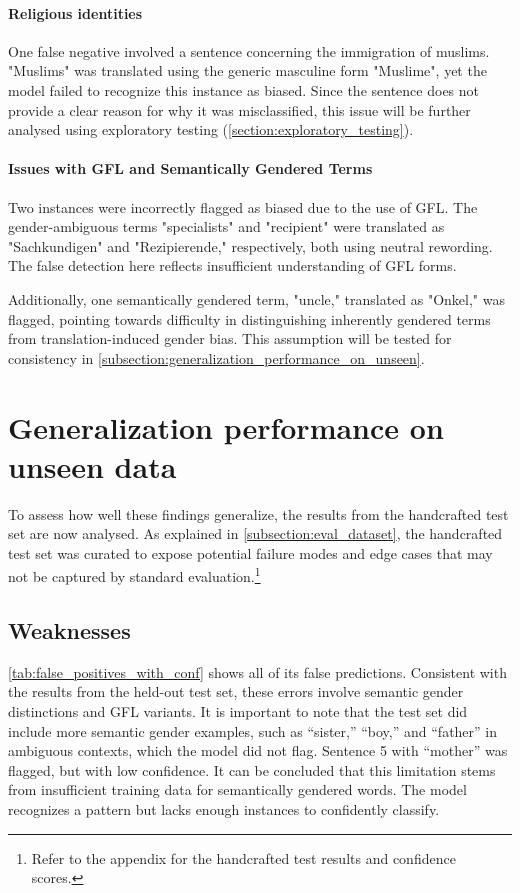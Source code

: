     \paragraph{Religious identities}
    
    One false negative involved a sentence concerning the immigration of muslims. "Muslims" was translated using the generic masculine form "Muslime", yet the model failed to recognize this instance as biased. Since the sentence does not provide a clear reason for why it was misclassified, this issue will be further analysed using exploratory testing (\autoref{section:exploratory_testing}).

    \paragraph{Issues with GFL and Semantically Gendered Terms}

    Two instances were incorrectly flagged as biased due to the use of GFL. The gender-ambiguous terms "specialists" and "recipient" were translated as "Sachkundigen" and "Rezipierende," respectively, both using neutral rewording. The false detection here reflects insufficient understanding of GFL forms.

    Additionally, one semantically gendered term, "uncle," translated as "Onkel," was flagged, pointing towards difficulty in distinguishing inherently gendered terms from translation-induced gender bias. This assumption will be tested for consistency in \autoref{subsection:generalization_performance_on_unseen}.

\section{Generalization performance on unseen data} \label{subsection:generalization_performance_on_unseen}
    To assess how well these findings generalize, the results from the handcrafted test set are now analysed. As explained in \autoref{subsection:eval_dataset}, the handcrafted test set was curated to expose potential failure modes and edge cases that may not be captured by standard evaluation.\footnote{Refer to the appendix for the handcrafted test results and confidence scores.}

    \subsection{Weaknesses}
    \autoref{tab:false_positives_with_conf} shows all of its false predictions. Consistent with the results from the held-out test set, these errors involve semantic gender distinctions and GFL variants. It is important to note that the test set did include more semantic gender examples, such as “sister,” “boy,” and “father” in ambiguous contexts, which the model did not flag. Sentence 5 with “mother” was flagged, but with low confidence. It can be concluded that this limitation stems from insufficient training data for semantically gendered words. The model recognizes a pattern but lacks enough instances to confidently classify.

